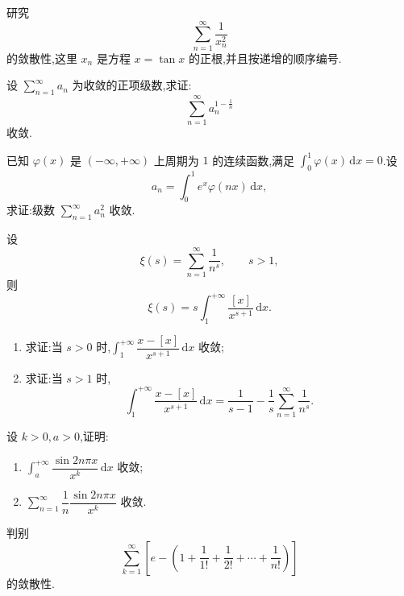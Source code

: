 \documentclass[../数学分析培优讲义.tex]{subfiles}
\begin{document}
\begin{example}
研究
\[
    \sum\limits_{n=1}^{\infty}\dfrac{1}{x_n^2}
\]
的敛散性,这里 $x_n$ 是方程 $x=\tan x$ 的正根,并且按递增的顺序编号.
\end{example}
\exampleblank

\begin{example}
设 $\displaystyle\sum\limits_{n=1}^{\infty}a_n$ 为收敛的正项级数,求证:
\[
    \sum\limits_{n=1}^{\infty}a_n^{1-\frac{1}{n}}
\]
收敛.
\end{example}
\exampleblank

\begin{example}
已知 $\varphi(x)$ 是 $(-\infty,+\infty)$ 上周期为 $1$ 的连续函数,满足 $\displaystyle\int_0^1\varphi(x)\,\mathrm{d}x=0$.设
\[
    a_n=\int_0^1e^x\varphi(nx)\,\mathrm{d}x,
\]
求证:级数 $\displaystyle\sum\limits_{n=1}^{\infty}a_n^2$ 收敛.
\end{example}
\exampleblank

\begin{example}[\markstar]
设
\[
    \xi(s)=\sum\limits_{n=1}^{\infty}\dfrac{1}{n^s},
    \qquad s>1,
\]
则
\[
    \xi(s)=s\int_1^{+\infty}\dfrac{[x]}{x^{s+1}}\,\mathrm{d}x.
\]
\end{example}
\exampleblank

\begin{example}[\markstar]
\begin{enumerate}[label=(\arabic*)]
    \item 求证:当 $s>0$ 时,$\displaystyle\int_1^{+\infty}\dfrac{x-[x]}{x^{s+1}}\,\mathrm{d}x$ 收敛;
    \item 求证:当 $s>1$ 时,
    \[
        \int_1^{+\infty}\dfrac{x-[x]}{x^{s+1}}\,\mathrm{d}x
        =\dfrac{1}{s-1}-\dfrac{1}{s}\sum\limits_{n=1}^{\infty}\dfrac{1}{n^s}.
    \]
\end{enumerate}
\end{example}
\exampleblank

\begin{example}
设 $k>0,a>0$,证明:
\begin{enumerate}[label=(\arabic*)]
    \item $\displaystyle\int_a^{+\infty}\dfrac{\sin2n\pi x}{x^k}\,\mathrm{d}x$ 收敛;
    \item $\displaystyle\sum\limits_{n=1}^{\infty}\dfrac{1}{n}\dfrac{\sin2n\pi x}{x^k}$ 收敛.
\end{enumerate}
\end{example}
\exampleblank

\begin{example}
判别
\[
    \sum\limits_{k=1}^{\infty}\left[e-\left(1+\dfrac{1}{1!}+\dfrac{1}{2!}+\cdots+\dfrac{1}{n!}\right)\right]
\]
的敛散性.
\end{example}
\exampleblank
\end{document}
